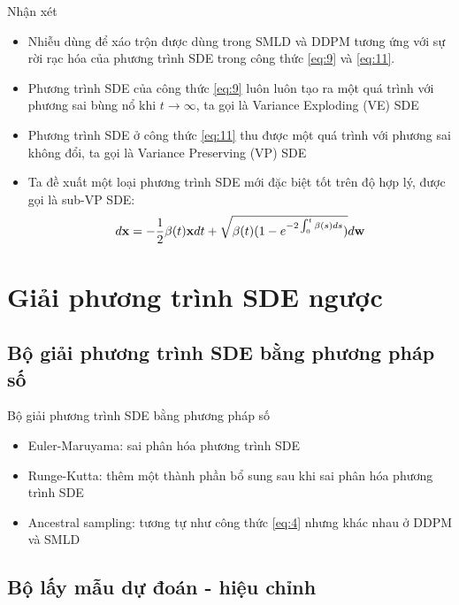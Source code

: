 \documentclass[10pt]{beamer}
\theoremstyle{remark}
\numberwithin{algocf}{section}
\numberwithin{equation}{section}
\numberwithin{dl}{section}
\numberwithin{figure}{section}
\begin{document}
\begin{frame}{Nhận xét}
	\begin{itemize}
		\item Nhiễu dùng để xáo trộn được dùng trong SMLD và DDPM tương ứng với sự rời rạc hóa của phương trình SDE trong công thức \ref{eq:9} và \ref{eq:11}.
		\item Phương trình SDE của công thức \ref{eq:9} luôn luôn tạo ra một quá trình với phương sai bùng nổ khi $t \rightarrow \infty$, ta gọi là Variance Exploding (VE) SDE
		\item Phương trình SDE ở công thức \ref{eq:11} thu được một quá trình với phương sai không đổi, ta gọi là Variance Preserving (VP) SDE
		\item Ta đề xuất một loại phương trình SDE mới đặc biệt tốt trên độ hợp lý, được gọi là sub-VP SDE:
		\begin{equation} \label{eq:12}
			d \bold{x} = -\dfrac{1}{2} \beta(t) \bold{x} dt + \sqrt{\beta(t) (1-e^{-2\int_{0}^{t} \beta(s)ds} )} d \bold{w}
		\end{equation}
	\end{itemize}
\end{frame}

\section{Giải phương trình SDE ngược}

\subsection{Bộ giải phương trình SDE bằng phương pháp số}

\begin{frame}{Bộ giải phương trình SDE bằng phương pháp số}
	\begin{itemize}
		\item Euler-Maruyama: sai phân hóa phương trình SDE
		\item Runge-Kutta: thêm một thành phần bổ sung sau khi sai phân hóa phương trình SDE
		\item Ancestral sampling: tương tự như công thức \ref{eq:4} nhưng khác nhau ở DDPM và SMLD
	\end{itemize}
\end{frame}

\subsection{Bộ lấy mẫu dự đoán - hiệu chỉnh}
\end{document}
